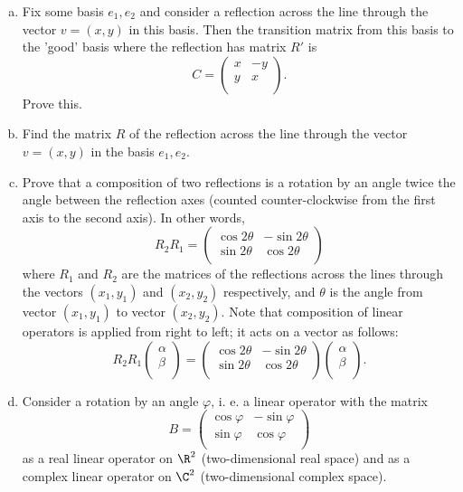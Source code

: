 \begin{enumerate}[1. ]
\begin{enumerate}[a) ]
\item Fix some basis $e_1, e_2$ and consider a reflection across the line through the vector $v = (x, y)$ in this basis. Then the transition matrix from this basis to the 'good' basis where the reflection has matrix $R'$ is 
$$
C = \begin{pmatrix}
    x & -y\\
    y & x\\
\end{pmatrix}.
$$
Prove this.

\item Find the matrix $R$ of the reflection across the line through the vector $v = (x, y)$ in the basis $e_1, e_2$.

\item Prove that a composition of two reflections is a rotation by an angle twice the angle between the reflection axes (counted counter-clockwise from the first axis to the second axis). In other words,
$$
R_2 R_1
= \begin{pmatrix}
    \cos 2\theta & -\sin 2\theta\\
    \sin 2\theta & \cos 2\theta\\
\end{pmatrix}
$$
where $R_1$ and $R_2$ are the matrices of the reflections across the lines through the vectors $(x_1, y_1)$ and $(x_2, y_2)$ respectively, and $\theta$ is the angle from vector $(x_1, y_1)$ to vector $(x_2, y_2)$. Note that composition of linear operators is applied from right to left; it acts on a vector as follows:
$$
R_2 R_1
\begin{pmatrix}
    \alpha\\
    \beta\\
\end{pmatrix}
= \begin{pmatrix}
    \cos 2\theta & -\sin 2\theta\\
    \sin 2\theta & \cos 2\theta\\
\end{pmatrix}
\begin{pmatrix}
    \alpha\\
    \beta\\
\end{pmatrix}.
$$

\item Consider a rotation by an angle $\varphi$, i. e. a linear operator with the matrix
$$
B =\begin{pmatrix}
    \cos \varphi & -\sin \varphi\\
    \sin \varphi & \cos \varphi\\
\end{pmatrix}
$$
as a real linear operator on $\R^2$ (two-dimensional real space) and as a complex linear operator on $\C^2$ (two-dimensional complex space). 


\end{enumerate}
\end{enumerate}
